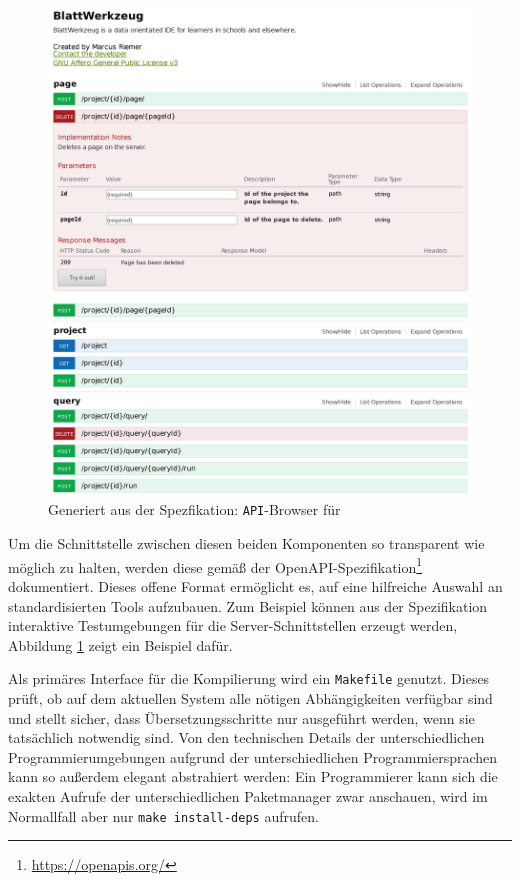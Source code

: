 \begin{figure}[p]
  \centering \includegraphics[width=\textwidth]{images/openapi-query-example.png}
  \caption{Generiert aus der Spezfikation: \texttt{API}-Browser für \idename{}}
  \label{fig:openapi-query-example}
\end{figure}

Um die Schnittstelle zwischen diesen beiden Komponenten so transparent wie möglich zu halten, werden diese gemäß der OpenAPI-Spezifikation\footnote{\url{https://openapis.org/}} dokumentiert. Dieses offene Format ermöglicht es, auf eine hilfreiche Auswahl an standardisierten Tools aufzubauen. Zum Beispiel können aus der Spezifikation interaktive Testumgebungen für die Server-Schnittstellen erzeugt werden, Abbildung \ref{fig:openapi-query-example} zeigt ein Beispiel dafür.

Als primäres Interface für die Kompilierung wird ein \texttt{Makefile} genutzt. Dieses prüft, ob auf dem aktuellen System alle nötigen Abhängigkeiten verfügbar sind und stellt sicher, dass Übersetzungsschritte nur ausgeführt werden, wenn sie tatsächlich notwendig sind. Von den technischen Details der unterschiedlichen Programmierumgebungen aufgrund der unterschiedlichen Programmiersprachen kann so außerdem elegant abstrahiert werden: Ein Programmierer kann sich die exakten Aufrufe der unterschiedlichen Paketmanager zwar anschauen, wird im Normallfall aber nur \texttt{make install-deps} aufrufen.

